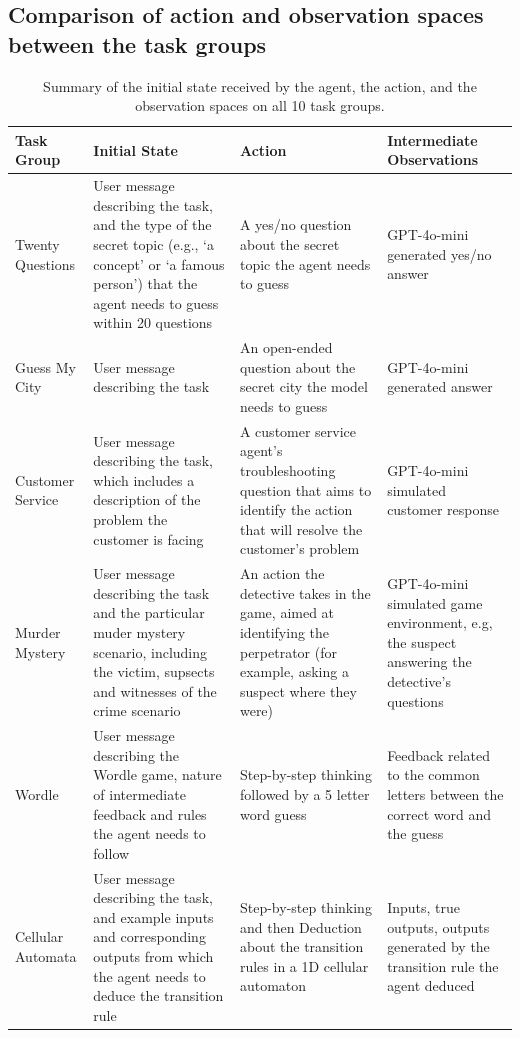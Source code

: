 \documentclass{article}
\theoremstyle{plain}
\theoremstyle{definition}
\theoremstyle{remark}
\begin{document}
\subsection{Comparison of action and observation spaces between the task groups}
\begin{table}[h!]
\caption{Summary of the initial state received by the agent, the action, and the observation spaces on all 10 task groups. }
\label{tab:task_group_observation_spaces}
\centering
\begin{tabular}{|l|p{4cm}|p{4cm}|p{4cm}|}
\hline
\textbf{Task Group} & \textbf{Initial State} & \textbf{Action} & \textbf{Intermediate Observations} \\
\hline
Twenty Questions & User message describing the task, and the type of the secret topic (e.g., `a concept' or `a famous person') that the agent needs to guess within 20 questions & A yes/no question about the secret topic the agent needs to guess & GPT-4o-mini generated yes/no answer \\
\hline
Guess My City & User message describing the task & An open-ended question about the secret city the model needs to guess & GPT-4o-mini generated answer \\
\hline
Customer Service & User message describing the task, which includes a description of the problem the customer is facing & A customer service agent’s troubleshooting question that aims to identify the action that will resolve the customer's problem & GPT-4o-mini simulated customer response \\
\hline
Murder Mystery & User message describing the task and the particular muder mystery scenario, including the victim, supsects and witnesses of the crime scenario & An action the detective takes in the game, aimed at identifying the perpetrator (for example, asking a suspect where they were) & GPT-4o-mini simulated game environment, e.g, the suspect answering the detective's questions \\
\hline
Wordle & User message describing the Wordle game, nature of intermediate feedback and rules the agent needs to follow & Step-by-step thinking followed by a 5 letter word guess & Feedback related to the common letters between the correct word and the guess \\
\hline
Cellular Automata & User message describing the task, and example inputs and corresponding outputs from which the agent needs to deduce the transition rule & Step-by-step thinking and then Deduction about the transition rules in a 1D cellular automaton & Inputs, true outputs, outputs generated by the transition rule the agent deduced \\

\end{tabular}
\end{table}
\end{document}
